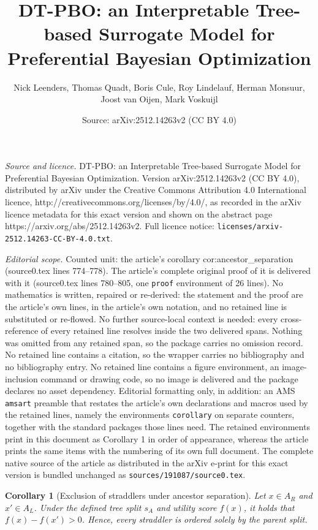 \documentclass[10pt,a4paper]{amsart}
\title{DT-PBO: an Interpretable Tree-based Surrogate Model for Preferential Bayesian Optimization}
\author{Nick Leenders, Thomas Quadt, Boris Cule, Roy Lindelauf, Herman Monsuur, Joost van Oijen, Mark Voskuijl}
\date{Source: arXiv:2512.14263v2 (CC BY 4.0)}
\newtheorem{corollary}{Corollary}
\begin{document}
\maketitle

\noindent\emph{Source and licence.} DT-PBO: an Interpretable Tree-based Surrogate Model for Preferential Bayesian Optimization. Version arXiv:2512.14263v2 (CC BY 4.0), distributed by arXiv under the Creative Commons Attribution 4.0 International licence, http://creativecommons.org/licenses/by/4.0/, as recorded in the arXiv licence metadata for this exact version and shown on the abstract page https://arxiv.org/abs/2512.14263v2. Full licence notice: \texttt{licenses/arxiv-2512.14263-CC-BY-4.0.txt}.\par\smallskip

\noindent\textit{Editorial scope.} Counted unit: the article's corollary cor:ancestor\_separation (source0.tex lines 774--778). The article's complete original proof of it is delivered with it (source0.tex lines 780--805, one \texttt{proof} environment of 26 lines). No mathematics is written, repaired or re-derived: the statement and the proof are the article's own lines, in the article's own notation, and no retained line is substituted or re-flowed.  No further source-local context is needed: every cross-reference of every retained line resolves inside the two delivered spans.  Nothing was omitted from any retained span, so the package carries no omission record.  No retained line contains a citation, so the wrapper carries no bibliography and no bibliography entry.  No retained line contains a figure environment, an image-inclusion command or drawing code, so no image is delivered and the package declares no asset dependency.  Editorial formatting only, in addition: an AMS \texttt{amsart} preamble that restates the article's own declarations and macros used by the retained lines, namely the environments \texttt{corollary} on separate counters, together with the standard packages those lines need.  The retained environments print in this document as Corollary 1 in order of appearance, whereas the article prints the same items with the numbering of its own full document.  The complete native source of the article as distributed in the arXiv e-print for this exact version is bundled unchanged as \texttt{sources/191087/source0.tex}.
\begin{corollary}[Exclusion of straddlers under ancestor separation]
\label{cor:ancestor_separation}
Let $x\in A_R$ and $x'\in A_L$. Under the defined tree split $s_A$ and utility score $f(x)$, it holds that $f(x)-f(x')>0$. 
Hence, every straddler is ordered solely by the parent split.
\end{corollary}
\end{document}
